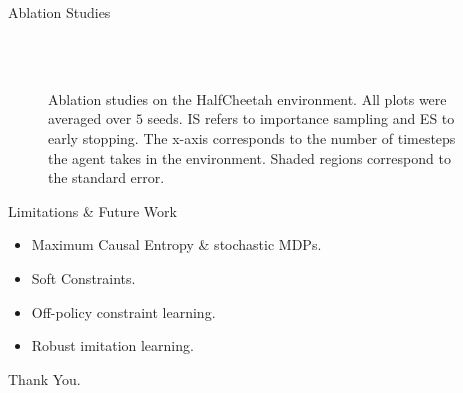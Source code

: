 \documentclass[t, pdf, aspectratio=169]{beamer}
\begin{document}
\begin{frame}{Ablation Studies}
\begin{figure}
\begin{center}
    \\
    \\
    \caption{\tiny{Ablation studies on the HalfCheetah environment. All plots were averaged over $5$ seeds. IS refers to importance sampling and ES to early stopping. The x-axis corresponds to the number of timesteps the agent takes in the environment. Shaded regions correspond to the standard error.}}
    \label{fig:abl}
\end{center}
\end{figure}    
\end{frame}


\begin{frame}{Limitations \& Future Work}
\renewcommand{\baselinestretch}{1.5}

\begin{itemize}
    \item Maximum Causal Entropy \& stochastic MDPs.
    \item Soft Constraints. 
    \item Off-policy constraint learning.
    \item Robust imitation learning.
\end{itemize}
\end{frame}

%     


\begin{frame}
    \vfill
    \hfill\LARGE{Thank You.}
\end{frame}
\end{document}
